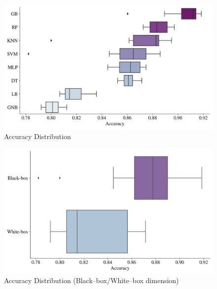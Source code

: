 \begin{figure}[H]
    \centering
    \caption{Accuracy Distribution}\vspace{0.5em}
    \label{fig:accdist}
    \includegraphics[width=140mm]{Figures/ACCURACY_Distribution.jpg}
    
    \vspace{-1em}
\end{figure}

\begin{figure}[H]
    \centering
    \caption{Accuracy Distribution (Black--box/White--box dimension)}\vspace{0.5em}
    \label{fig:accdistbbwb}
    \includegraphics[width=140mm]{Figures/ACCURACY_Distribution_BB_WB.jpg}
    
    \vspace{-1em}
\end{figure}

